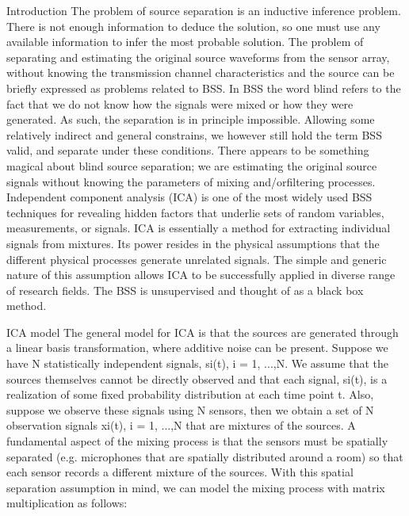 \cite{journals/informaticaSI/NaikK11}
\begin{compactitem}

\item {Introduction}
The problem of source separation is an inductive inference problem. There is not enough information
to deduce the solution, so one must use any available information to infer the most probable solution.
The problem of separating and estimating the original source waveforms from the sensor array,
without knowing the transmission channel characteristics and the source can be briefly expressed
as problems related to BSS. In BSS the word blind refers to the fact that we do not know how the signals
were mixed or how they were generated. As such, the separation is in principle impossible. Allowing some relatively indirect and general constrains, we however still hold the term BSS valid, and separate under these conditions. There appears to be something magical about blind source separation; we are estimating the original source signals without knowing the parameters of mixing and/orfiltering processes. Independent component analysis (ICA) is one of the most widely used BSS techniques for revealing hidden factors that underlie sets of random variables, measurements, or signals. ICA is essentially a method for extracting individual
signals from mixtures. Its power resides in the physical assumptions that the different physical processes
generate unrelated signals. The simple and generic nature of this assumption allows ICA to be successfully applied in diverse range of research fields. The BSS is unsupervised and thought of as a black box method.

\item {ICA model}
The general model for ICA is that the sources are generated
through a linear basis transformation, where additive
noise can be present. Suppose we have N statistically independent
signals, si(t), i = 1, ...,N. We assume that the
sources themselves cannot be directly observed and that
each signal, si(t), is a realization of some fixed probability
distribution at each time point t. Also, suppose we observe
these signals using N sensors, then we obtain a set of N observation
signals xi(t), i = 1, ...,N that are mixtures of the
sources. A fundamental aspect of the mixing process is that
the sensors must be spatially separated (e.g. microphones
that are spatially distributed around a room) so that each
sensor records a different mixture of the sources. With this
spatial separation assumption in mind, we can model the
mixing process with matrix multiplication as follows:


\end{compactitem}
